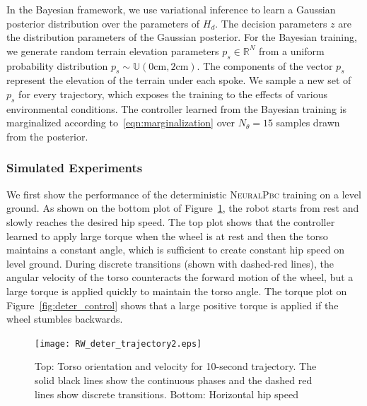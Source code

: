In the Bayesian framework, we use variational inference to learn a Gaussian
posterior distribution over the parameters of $H_d$.
%
The decision parameters $z$ are the distribution parameters of the Gaussian
posterior.
%
For the Bayesian training, we generate random terrain elevation parameters $p_s
\in \mathbb{R}^N$ from a uniform probability distribution $p_s \sim
\mathbb{U}(0 \textrm{cm}, 2\textrm{cm})$.
%
The components of the vector $p_s$ represent the elevation of the terrain under
each spoke.
%
We sample a new set of $p_s$ for every trajectory, which exposes the training to
the effects of various environmental conditions.
%
The controller learned from the Bayesian training is marginalized according
to~\eqref{eqn:marginalization} over $N_\theta = 15$ samples drawn from the
posterior. 


\subsubsection{Simulated Experiments}

We first show the performance of the deterministic \textsc{NeuralPbc} training
on a level ground.
%
As shown on the bottom plot of Figure~\ref{fig:deter_rw_trajectory}, the robot
starts from rest and slowly reaches the desired hip speed.
%
The top plot shows that the controller learned to apply large torque
when the wheel is at rest and then the torso maintains a constant angle, which
is sufficient to create constant hip speed on level ground.  
%
During discrete transitions (shown with dashed-red lines), the angular velocity
of the torso counteracts the forward motion of the wheel, but a large torque is
applied quickly to maintain the torso angle.
%
The torque plot on Figure~\ref{fig:deter_control} shows that a large
positive torque is applied if the wheel stumbles backwards.
%

\begin{figure}[H]
    \centering
    \texttt{[image: RW\_deter\_trajectory2.eps]}
    \caption{Top: Torso orientation and velocity for 10-second trajectory. The
            solid black lines show the continuous phases and the dashed red
            lines show discrete transitions. Bottom: Horizontal hip speed}
    \label{fig:deter_rw_trajectory}
\end{figure}

